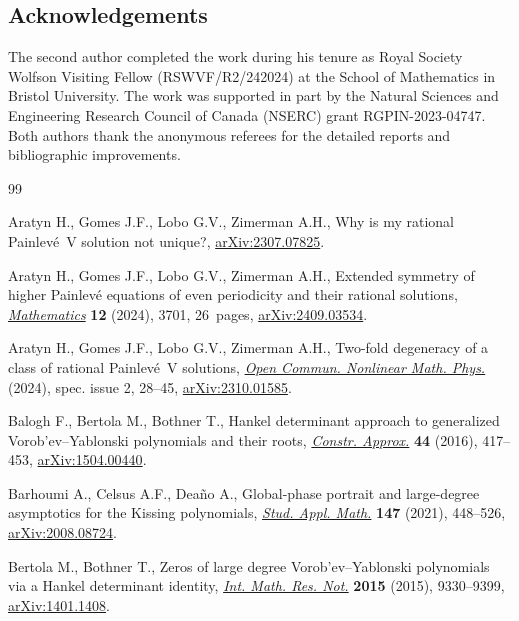 \documentclass[10pt,a4paper]{amsart}
\numberwithin{equation}{section}
\theoremstyle{definition}
\begin{document}
\subsection*{Acknowledgements}
The second author completed the work during his tenure as Royal Society Wolfson Visiting
Fellow (RSWVF/R2/242024) at the School of Mathematics in Bristol University. The work was supported in part by the Natural Sciences and Engineering Research Council of Canada (NSERC) grant RGPIN-2023-04747. Both authors thank the anonymous referees for the detailed reports and bibliographic improvements.


\begin{thebibliography}{99}
\footnotesize\itemsep=0pt

Aratyn H., Gomes J.F., Lobo G.V., Zimerman A.H., Why is my rational
 Painlev\'e~V solution not unique?,
 \href{http://arxiv.org/abs/2307.07825}{arXiv:2307.07825}.

Aratyn H., Gomes J.F., Lobo G.V., Zimerman A.H., Extended symmetry of higher
 Painlev\'e equations of even periodicity and their rational solutions,
 \href{https://doi.org/10.3390/math12233701}{\textit{Mathematics}} \textbf{12}
 (2024), 3701, 26~pages,
 \href{http://arxiv.org/abs/2409.03534}{arXiv:2409.03534}.

Aratyn H., Gomes J.F., Lobo G.V., Zimerman A.H., Two-fold degeneracy of a class
 of rational {P}ainlev\'e~{V} solutions,
 \href{https://doi.org/10.46298/ocnmp.13201}{\textit{Open Commun. Nonlinear
 Math. Phys.}} (2024), spec. issue 2, 28--45,
 \href{http://arxiv.org/abs/2310.01585}{arXiv:2310.01585}.

Balogh F., Bertola M., Bothner T., Hankel determinant approach to generalized
 {V}orob'ev--{Y}ablonski polynomials and their roots,
 \href{https://doi.org/10.1007/s00365-016-9328-4}{\textit{Constr. Approx.}}
 \textbf{44} (2016), 417--453,
 \href{http://arxiv.org/abs/1504.00440}{arXiv:1504.00440}.

Barhoumi A., Celsus A.F., Dea\~{n}o A., Global-phase portrait and large-degree
 asymptotics for the {K}issing polynomials,
 \href{https://doi.org/10.1111/sapm.12387}{\textit{Stud. Appl. Math.}}
 \textbf{147} (2021), 448--526,
 \href{http://arxiv.org/abs/2008.08724}{arXiv:2008.08724}.

Bertola M., Bothner T., Zeros of large degree {V}orob'ev--{Y}ablonski
 polynomials via a {H}ankel determinant identity,
 \href{https://doi.org/10.1093/imrn/rnu239}{\textit{Int. Math. Res. Not.}}
 \textbf{2015} (2015), 9330--9399,
 \href{http://arxiv.org/abs/1401.1408}{arXiv:1401.1408}.


\end{thebibliography}
\end{document}

